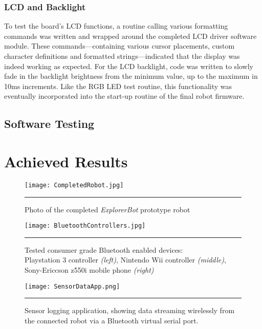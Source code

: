 \FloatBarrier
\subsubsection{LCD and Backlight}

To test the board's LCD functions, a routine calling various formatting commands was written and wrapped around the completed LCD driver software module. These commands---containing various cursor placements, custom character definitions and formatted strings---indicated that the display was indeed working as expected. For the LCD backlight, code was written to slowly fade in the backlight brightness from the minimum value, up to the maximum in 10ms increments. Like the RGB LED test routine, this functionality was eventually incorporated into the start-up routine of the final robot firmware.

\FloatBarrier
\subsection{Software Testing}


\section{Achieved Results}


\begin{figure}[tbph]
	\vspace{1em}
	\centering
		\texttt{[image: CompletedRobot.jpg]}
	\rule{35em}{0.5pt}
	\caption[Photo of Completed Robot]{Photo of the completed \textit{ExplorerBot} prototype robot}
	\label{fig:completedrobot}
\end{figure}

\begin{figure}[tbph]
	\vspace{1em}
	\centering
		\texttt{[image: BluetoothControllers.jpg]}
	\rule{35em}{0.5pt}
	\caption[Tested Working Controllers]{Tested consumer grade Bluetooth enabled devices: \\ Playstation 3 controller \textit{(left)}, Nintendo Wii controller \textit{(middle)}, Sony-Ericcson z550i mobile phone \textit{(right)} }
	\label{fig:workingbtcontrollers}
\end{figure}

\begin{figure}[tbph]
	\vspace{1em}
	\centering
		\texttt{[image: SensorDataApp.png]}
	\rule{35em}{0.5pt}
	\caption[Sensor Logging Host Application]{Sensor logging application, showing data streaming wirelessly from the connected robot via a Bluetooth virtual serial port. }
	\label{fig:sensorhostapp}
\end{figure}
